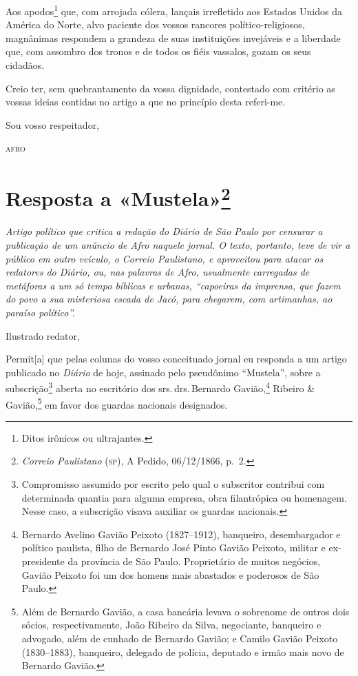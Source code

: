 Aos apodos\footnote{Ditos irônicos ou ultrajantes.} que, com arrojada
cólera, lançais irrefletido aos Estados Unidos da América do Norte, alvo
paciente dos vossos rancores político-religiosos, magnânimas respondem a
grandeza de suas instituições invejáveis e a liberdade que, com assombro
dos tronos e de todos os fiéis vassalos, gozam os seus cidadãos.

Creio ter, sem quebrantamento da vossa dignidade, contestado com
critério as vossas ideias contidas no artigo a que no princípio desta
referi-me.

\begin{flushright}
Sou vosso respeitador,

\textsc{afro}
\end{flushright}

\chapter{Resposta a «Mustela»\footnote{\emph{Correio Paulistano} (\textsc{sp}), A Pedido, 06/12/1866, p.~2.}}

\begin{didascalia}\itshape
Artigo político que critica a redação do \textnormal{Diário de São Paulo} por
censurar a publicação de um anúncio de Afro naquele jornal. O texto,
portanto, teve de vir a público em outro veículo, o \textnormal{Correio
Paulistano}, e aproveitou para atacar os redatores do
\textnormal{Diário}, ou, nas palavras de Afro, usualmente carregadas de
metáforas a um só tempo bíblicas e urbanas, ``capoeiras da imprensa, que
fazem do povo a sua misteriosa escada de Jacó, para chegarem, com
artimanhas, ao paraíso político''.
\end{didascalia}



Ilustrado redator,

Permit{[}a{]} que pelas colunas do vosso conceituado jornal eu responda
a um artigo publicado no \emph{Diário} de hoje, assinado pelo pseudônimo
``Mustela'', sobre a subscrição\footnote{Compromisso assumido por
  escrito pelo qual o subscritor contribui com determinada quantia para
  alguma empresa, obra filantrópica ou homenagem. Nesse caso, a
  subscrição visava auxiliar os guardas nacionais.} aberta no escritório
dos srs.\,drs.\,Bernardo Gavião,\footnote{Bernardo Avelino Gavião Peixoto
  (1827--1912), banqueiro, desembargador e político paulista, filho de
  Bernardo José Pinto Gavião Peixoto, militar e ex-presidente da
  província de São Paulo. Proprietário de muitos negócios, Gavião
  Peixoto foi um dos homens mais abastados e poderosos de São Paulo.}
Ribeiro \& Gavião,\footnote{Além de Bernardo Gavião, a casa bancária
  levava o sobrenome de outros dois sócios, respectivamente, João
  Ribeiro da Silva, negociante, banqueiro e advogado, além de cunhado de
  Bernardo Gavião; e Camilo Gavião Peixoto (1830--1883), banqueiro,
  delegado de polícia, deputado e irmão mais novo de Bernardo Gavião.}
em favor dos guardas nacionais designados.

